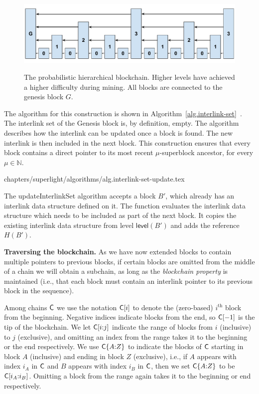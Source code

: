 \begin{figure}
    \caption{The probabilistic hierarchical blockchain.
    Higher levels have achieved a higher difficulty during
    mining. All blocks are connected to the genesis block $G$.}
    \centering
    \includegraphics[width=0.7\columnwidth,keepaspectratio]{chapters/superlight/figures/hierarchical-ledger-span.pdf}
    \label{fig.hierarchy}
\end{figure}

The algorithm for this construction is shown in
Algorithm~\ref{alg.interlink-set}~\cite{compactsuperblocks}. The
interlink set of the Genesis block is, by definition, empty. The algorithm
describes how the interlink can be updated once a block is found. The new
interlink is then included in the next block. This construction ensures that
every block contains a direct pointer to its most recent $\mu$-superblock
ancestor, for every $\mu \in \mathbb{N}$.

{chapters/superlight/algorithms/alg.interlink-set-update.tex}

The \textsf{updateInterlinkSet} algorithm accepts a block $B'$, which already has an
interlink data structure defined on it. The function evaluates the
interlink data structure which needs to be included as part of the next block.
It copies the existing interlink data structure from level $\textsf{level}(B')$
and adds the reference $H(B')$.

\noindent\textbf{Traversing the blockchain. }
As we have now extended blocks to contain multiple pointers to previous blocks,
if certain blocks are omitted from the middle of a chain we will obtain a
subchain, as long as the \emph{blockchain property} is maintained (i.e., that
each block must contain an interlink pointer to its previous block in the
sequence).

Among chains $\mathsf{C}$ we use the notation $\mathsf{C}[i]$ to denote the (zero-based)
$i^\text{th}$ block from the beginning. Negative indices indicate blocks from
the end, so $\mathsf{C}[-1]$ is the tip of the blockchain. We let $\mathsf{C}[i{:}j]$ indicate
the range of blocks from $i$ (inclusive) to $j$ (exclusive), and omitting an
index from the range takes it to the beginning or the end respectively. We use
$\mathsf{C}\{A{:}Z\}$ to indicate the blocks of $\mathsf{C}$ starting in block $A$
(inclusive) and ending in block $Z$ (exclusive), i.e., if $A$ appears with
index $i_A$ in $\mathsf{C}$ and $B$ appears with index $i_B$ in $\mathsf{C}$, then we
set $\mathsf{C}\{A{:}Z\}$ to be $\mathsf{C}[i_A{:}i_B]$. Omitting a block from the range
again takes it to the beginning or end respectively.

